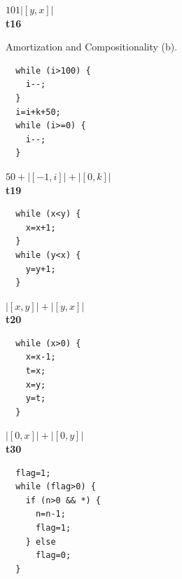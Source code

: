 \documentclass[nocopyrightspace,preprint,pldi]{sigplanconf-pldi15}
\begin{document}
{\begin{figure}[t!]
\begin{minipage}[b]{\progwidth}
\begin{center}
$101|[y,x]|$
\\[.7\baselineskip]
      {\bf t16}
    \end{center}
  \end{minipage}


   \caption{Amortization and Compositionality (b).}
  \label{fig:cat1b}
\end{figure}


\begin{figure}[t!]
 \setlength{\progwidth}{.24\linewidth}
  \centering

  \begin{minipage}[b]{\progwidth}
    \begin{center}
   \begin{lstlisting}
  while (i>100) {
    i--;
  }
  i=i+k+50;
  while (i>=0) {
    i--;
  }
   \end{lstlisting}

$50 + |[-1,i]| + |[0,k]|$
\\[.7\baselineskip]
      {\bf t19}
    \end{center}
  \end{minipage}%
%
%
%
  \begin{minipage}[b]{\progwidth}
    \begin{center}
   \begin{lstlisting}
  while (x<y) {
    x=x+1;
  }
  while (y<x) {
    y=y+1;
  }
   \end{lstlisting}

$|[x,y]|+|[y,x]|$
\\[.7\baselineskip]
      {\bf t20}
    \end{center}
  \end{minipage}%
%
%
  \begin{minipage}[b]{\progwidth}
    \begin{center}
   \begin{lstlisting}
  while (x>0) {
    x=x-1;
    t=x;
    x=y;
    y=t;
  }
   \end{lstlisting}

$|[0,x]|+|[0,y]|$
\\[.7\baselineskip]
      {\bf t30}
    \end{center}
  \end{minipage}
%
%
  \begin{minipage}[b]{\progwidth}
    \begin{center}
   \begin{lstlisting}
  flag=1;
  while (flag>0) {
    if (n>0 && *) {
      n=n-1;
      flag=1;
    } else
      flag=0;
  }
   \end{lstlisting}


\end{center}
\end{minipage}
\end{figure}}
\end{document}
